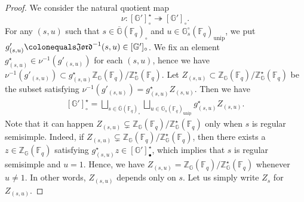 \documentclass{amsart}
\newcommand{\unip}{\mathrm{unip}}
\newcommand{\Jord}{\mathfrak{Jord}}
\newcommand{\F}{\mathbb{F}}
\newcommand{\FF}{\mathbb{F}}
\newcommand{\bbG}{\mathbb{G}}
\newcommand{\bbZ}{\mathbb{Z}}
\theoremstyle{plain}
\theoremstyle{definition}
\theoremstyle{remark}
\theoremstyle{theorem}
\begin{document}
\begin{proof}
We consider the natural quotient map
\[
\nu\colon [\bbG']^{\star}_{\circ}\twoheadrightarrow[\bbG']_{\circ}.
\]
For any $(s,u)$ such that $s \in \overline{\bbG}(\FF_q)_{\circ}$ and $u\in \bbG_s^\circ(\FF_q)_{\unip}$, we put $g'_{(s,u)}\colonequals \Jord^{-1}(s,u)\in[\bbG']_{\circ}$.
We fix an element $g^{\star}_{(s,u)}\in \nu^{-1}(g'_{(s,u)})$ for each $(s,u)$, hence we have $\nu^{-1}(g'_{(s,u)})\subset g^{\star}_{(s,u)}\bbZ_{\bbG}(\F_{q})/\bbZ_{\bbG}^{\star}(\F_{q})$.
Let $Z_{(s,u)}\subset\bbZ_{\bbG}(\F_{q})/\bbZ_{\bbG}^{\star}(\F_{q})$ be the subset satisfying $\nu^{-1}(g'_{(s,u)})=g^{\star}_{(s,u)}Z_{(s,u)}$.
Then we have
\begin{align}\label{eq:stratification}
[\bbG']^{\star}_{\circ}
=
\bigsqcup_{s\in\overline{\bbG}(\F_{q})_{\circ}}\bigsqcup_{u\in\bbG_{s}(\F_{q})_{\unip}}g^{\star}_{(s,u)}Z_{(s,u)}.
\end{align}
Note that it can happen $Z_{(s,u)}\subsetneq\bbZ_{\bbG}(\F_{q})/\bbZ_{\bbG}^{\star}(\F_{q})$ only when $s$ is regular semisimple.
Indeed, if $Z_{(s,u)}\subsetneq\bbZ_{\bbG}(\F_{q})/\bbZ_{\bbG}^{\star}(\F_{q})$, then there exists a $z\in\bbZ_{\bbG}(\F_{q})$ satisfying $g^{\star}_{(s,u)}z\in [\bbG']^{\star}_{\bullet}$, which implies that $s$ is regular semisimple and $u=1$.
Hence, we have $Z_{(s,u)}=\bbZ_{\bbG}(\F_{q})/\bbZ_{\bbG}^{\star}(\F_{q})$ whenever $u\neq1$.
In other words, $Z_{(s,u)}$ depends only on $s$.
Let us simply write $Z_{s}$ for $Z_{(s,u)}$.


\end{proof}
\end{document}
